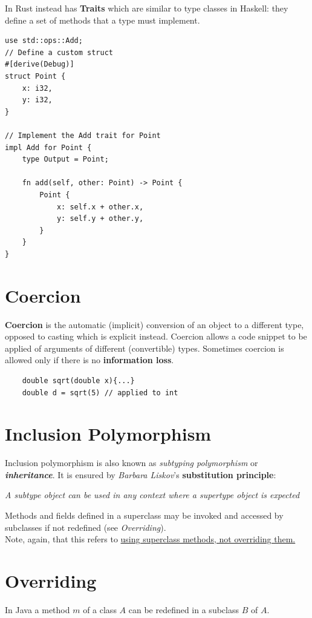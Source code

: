 \lstset{language=Rust}
In Rust instead has \textbf{Traits} which are similar to type classes in Haskell: they define a set of methods that a type must implement.

\begin{lstlisting}
use std::ops::Add;
// Define a custom struct
#[derive(Debug)]
struct Point {
    x: i32,
    y: i32,
}

// Implement the Add trait for Point
impl Add for Point {
    type Output = Point;

    fn add(self, other: Point) -> Point {
        Point {
            x: self.x + other.x,
            y: self.y + other.y,
        }
    }
}
\end{lstlisting}

\lstset{style=javaBlock}
\section{Coercion}
\textbf{Coercion} is the automatic (implicit) conversion of an object to a different type, opposed to casting which is explicit instead.
Coercion allows a code snippet to be applied of arguments of different (convertible) types.
Sometimes coercion is allowed only if there is no \textbf{information loss}.

\begin{lstlisting}
    double sqrt(double x){...}
    double d = sqrt(5) // applied to int
\end{lstlisting}

\section{Inclusion Polymorphism}
Inclusion polymorphism is also known as \textit{subtyping polymorphism} or \textit{\textbf{inheritance}}.
It is ensured by \textit{Barbara Liskov}'s \textbf{substitution principle}:
\begin{center}
    \textit{A subtype object can be used in any context where a supertype object is expected}
\end{center}
Methods and fields defined in a superclass may be invoked and accessed by subclasses if not redefined (see \textit{Overriding}).\\
Note, again, that this refers to \ul{using superclass methods, not overriding them.}

\section{Overriding}
In Java a method $m$ of a
class $A$ can be redefined
in a subclass $B$ of $A$.

